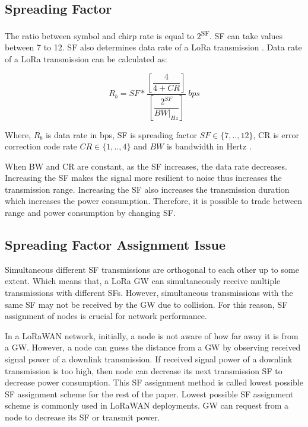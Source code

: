 \documentclass[conference]{IEEEtran}
\begin{document}
\subsection{Spreading Factor}
\par The ratio between symbol and chirp rate is equal to $2$\textsuperscript{SF}. SF can take values between 7 to 12. SF also determines data rate of a LoRa transmission \cite{AN1200.22}. Data rate of a LoRa transmission can be calculated as:

\begin{equation} \label{eq:bit_rate_sf}
R_{b} = SF * \dfrac{\left[ \dfrac{4}{4+CR} \right] }{ \left[ \dfrac{2^{SF}}{BW|_{Hz}} \right]} \ bps
\end{equation}

Where, $R_{b}$ is data rate in bps, SF is spreading factor $SF \in \{7,..,12\}$, CR is error correction code rate $CR \in \{1,..,4\}$ and $BW$ is bandwidth in Hertz \cite{AN1200.22}.

\par When BW and CR are constant, as the SF increases, the data rate decreases. Increasing the SF makes the signal more resilient to noise thus increases the transmission range. Increasing the SF also increases the transmission duration which increases the power consumption. Therefore, it is possible to trade between range and power consumption by changing SF.

\subsection{Spreading Factor Assignment Issue}
\par Simultaneous different SF transmissions are orthogonal to each other up to some extent. Which means that, a LoRa GW can simultaneously receive multiple transmissions with different SFs. However, simultaneous transmissions with the same SF may not be received by the GW due to collision. For this reason, SF assignment of nodes is crucial for network performance.

\par In a LoRaWAN network, initially, a node is not aware of how far away it is from a GW. However, a node can guess the distance from a GW by observing received signal power of a downlink transmission. If received signal power of a downlink transmission is too high, then node can decrease its next transmission SF to decrease power consumption. This SF assignment method is called lowest possible SF assignment scheme for the rest of the paper. Lowest possible SF assignment scheme is commonly used in LoRaWAN deployments. GW can request from a node to decrease its SF or transmit power.
\end{document}
